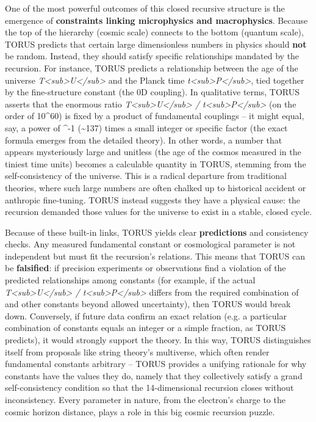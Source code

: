 \documentclass[
]{article}
\begin{document}
One of the most powerful outcomes of this closed recursive structure is
the emergence of \textbf{constraints linking microphysics and
macrophysics}. Because the top of the hierarchy (cosmic scale) connects
to the bottom (quantum scale), TORUS predicts that certain large
dimensionless numbers in physics should \textbf{not} be random. Instead,
they should satisfy specific relationships mandated by the recursion.
For instance, TORUS predicts a relationship between the age of the
universe \emph{T\textless sub\textgreater U\textless/sub\textgreater{}}
and the Planck time
\emph{t\textless sub\textgreater P\textless/sub\textgreater{}}, tied
together by the fine-structure constant \alpha (the 0D coupling). In
qualitative terms, TORUS asserts that the enormous ratio
\emph{T\textless sub\textgreater U\textless/sub\textgreater{} /
t\textless sub\textgreater P\textless/sub\textgreater{}} (on the order
of 10\^{}60) is fixed by a product of fundamental couplings -- it might
equal, say, a power of \alpha\^{}-1 (\textasciitilde137) times a small
integer or specific factor (the exact formula emerges from the detailed
theory). In other words, a number that appears mysteriously large and
unitless (the age of the cosmos measured in the tiniest time units)
becomes a calculable quantity in TORUS, stemming from the
self-consistency of the universe. This is a radical departure from
traditional theories, where such large numbers are often chalked up to
historical accident or anthropic fine-tuning. TORUS instead suggests
they have a physical cause: the recursion demanded those values for the
universe to exist in a stable, closed cycle.

Because of these built-in links, TORUS yields clear \textbf{predictions}
and consistency checks. Any measured fundamental constant or
cosmological parameter is not independent but must fit the recursion's
relations. This means that TORUS can be \textbf{falsified}: if precision
experiments or observations find a violation of the predicted
relationships among constants (for example, if the actual
\emph{T\textless sub\textgreater U\textless/sub\textgreater{} /
t\textless sub\textgreater P\textless/sub\textgreater{}} differs from
the required combination of \alpha and other constants beyond allowed
uncertainty), then TORUS would break down. Conversely, if future data
confirm an exact relation (e.g. a particular combination of constants
equals an integer or a simple fraction, as TORUS predicts), it would
strongly support the theory. In this way, TORUS distinguishes itself
from proposals like string theory's multiverse, which often render
fundamental constants arbitrary -- TORUS provides a unifying rationale
for why constants have the values they do, namely that they collectively
satisfy a grand self-consistency condition so that the 14-dimensional
recursion closes without inconsistency. Every parameter in nature, from
the electron's charge to the cosmic horizon distance, plays a role in
this big cosmic recursion puzzle.
\end{document}
